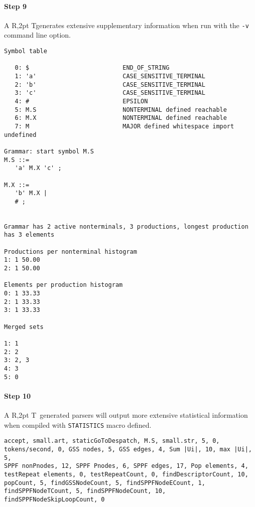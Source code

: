 \documentclass[11pt]{article}
\newenvironment{codebox}{\par\noindent\scriptsize\begin{boxedminipage}[t]{\textwidth}\vspace*{1ex}\par}{\end{boxedminipage}\par\vspace*{1ex}\par\noindent}
\newcommand{\art}{{\rm A\kern -2pt R\kern -2,2pt T}}
\begin{document}
\paragraph{Step 9}
\art generates extensive supplementary information when run with the
{\tt -v} command line option.
\begin{codebox}
\begin{verbatim}
Symbol table

   0: $                          END_OF_STRING
   1: 'a'                        CASE_SENSITIVE_TERMINAL
   2: 'b'                        CASE_SENSITIVE_TERMINAL
   3: 'c'                        CASE_SENSITIVE_TERMINAL
   4: #                          EPSILON
   5: M.S                        NONTERMINAL defined reachable
   6: M.X                        NONTERMINAL defined reachable
   7: M                          MAJOR defined whitespace import undefined

Grammar: start symbol M.S
M.S ::=
   'a' M.X 'c' ;

M.X ::=
   'b' M.X |
   # ;


Grammar has 2 active nonterminals, 3 productions, longest production has 3 elements

Productions per nonterminal histogram
1: 1 50.00
2: 1 50.00

Elements per production histogram
0: 1 33.33
2: 1 33.33
3: 1 33.33

Merged sets

1: 1
2: 2
3: 2, 3
4: 3
5: 0
\end{verbatim}
\end{codebox}

\paragraph{Step 10}
\art\ generated parsers will output more extensive statistical
information when compiled with {\tt STATISTICS} macro defined.

\begin{codebox}
\begin{verbatim}
accept, small.art, staticGoToDespatch, M.S, small.str, 5, 0,
tokens/second, 0, GSS nodes, 5, GSS edges, 4, Sum |Ui|, 10, max |Ui|, 5, 
SPPF nonPnodes, 12, SPPF Pnodes, 6, SPPF edges, 17, Pop elements, 4, 
testRepeat elements, 0, testRepeatCount, 0, findDescriptorCount, 10, 
popCount, 5, findGSSNodeCount, 5, findSPPFNodeECount, 1,
findSPPFNodeTCount, 5, findSPPFNodeCount, 10, findSPPFNodeSkipLoopCount, 0
\end{verbatim}
\end{codebox}
\end{document}
